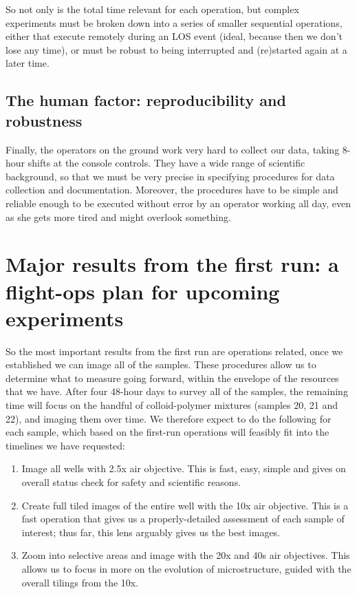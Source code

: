 So not only is the total time relevant for each operation, but complex
experiments must be broken down into a series of smaller sequential operations,
either that execute remotely during an LOS event (ideal, because then we don't
lose any time), or must be robust to being interrupted and (re)started again at
a later time.

\subsection{The human factor: reproducibility and robustness}\hypertarget{the-human-factor-reproducibility-and-robustness}{}\label{the-human-factor-reproducibility-and-robustness}
Finally, the operators on the ground work very hard to collect our data, taking
8-hour shifts at the console controls. They have a wide range of scientific
background, so that we must be very precise in specifying procedures for data
collection and documentation. Moreover, the procedures have to be simple and
reliable enough to be executed without error by an operator working all day,
even as she gets more tired and might overlook something.

\section{Major results from the first run: a flight-ops plan for upcoming experiments}\hypertarget{major-results-from-the-first-run-a-flight-ops-plan-for-upcoming-experiments}{}\label{major-results-from-the-first-run-a-flight-ops-plan-for-upcoming-experiments}
So the most important results from the first run are operations related, once we
established we can image all of the samples. These procedures allow us to
determine what to measure going forward, within the envelope of the resources
that we have. After four 48-hour days to survey all of the samples, the
remaining time will focus on the handful of colloid-polymer mixtures (samples
20, 21 and 22), and imaging them over time. We therefore expect to do the
following for each sample, which based on the first-run operations will feasibly
fit into the timelines we have requested:

\begin{enumerate}
\item Image all wells with 2.5x air objective. This is fast, easy, simple and gives on overall status check for safety and scientific reasons.
\item Create full tiled images of the entire well with the 10x air objective. This is a fast operation that gives us a properly-detailed assessment of each sample of interest; thus far, this lens arguably gives us the best images.
\item Zoom into selective areas and image with the 20x and 40s air objectives. This allows us to focus in more on the evolution of microstructure, guided with the overall tilings from the 10x.
\end{enumerate}

